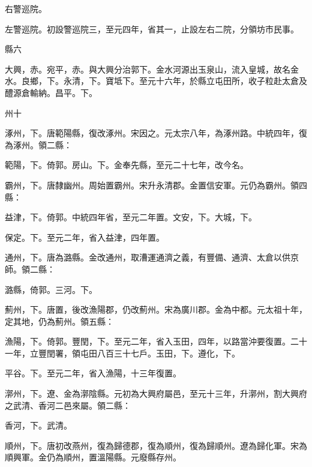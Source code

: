 \begin{pinyinscope}
 右警巡院。



 左警巡院。初設警巡院三，至元四年，省其一，止設左右二院，分領坊市民事。



 縣六



 大興，赤。宛平，赤。與大興分治郭下。金水河源出玉泉山，流入皇城，故名金水。良鄉，下。永清，下。寶坻下。至元十六年，於縣立屯田所，收子粒赴太倉及醴源倉輸納。昌平。下。



 州十



 涿州，下。唐範陽縣，復改涿州。宋因之。元太宗八年，為涿州路。中統四年，復為涿州。領二縣：



 範陽，下。倚郭。房山。下。金奉先縣，至元二十七年，改今名。



 霸州，下。唐隸幽州。周始置霸州。宋升永清郡。金置信安軍。元仍為霸州。領四縣：



 益津，下。倚郭。中統四年省，至元二年置。文安，下。大城，下。



 保定。下。至元二年，省入益津，四年置。



 通州，下。唐為潞縣。金改通州，取漕運通濟之義，有豐備、通濟、太倉以供京師。領二縣：



 潞縣，倚郭。三河。下。



 薊州，下。唐置，後改漁陽郡，仍改薊州。宋為廣川郡。金為中都。元太祖十年，定其地，仍為薊州。領五縣：



 漁陽，下。倚郭。豐閏，下。至元二年，省入玉田，四年，以路當沖要復置。二十一年，立豐閏署，領屯田八百三十七戶。玉田，下。遵化，下。



 平谷。下。至元二年，省入漁陽，十三年復置。



 漷州，下。遼、金為漷陰縣。元初為大興府屬邑，至元十三年，升漷州，割大興府之武清、香河二邑來屬。領二縣：



 香河，下。武清。



 順州，下。唐初改燕州，復為歸德郡，復為順州，復為歸順州。遼為歸化軍。宋為順興軍。金仍為順州，置溫陽縣。元廢縣存州。




\end{pinyinscope}
